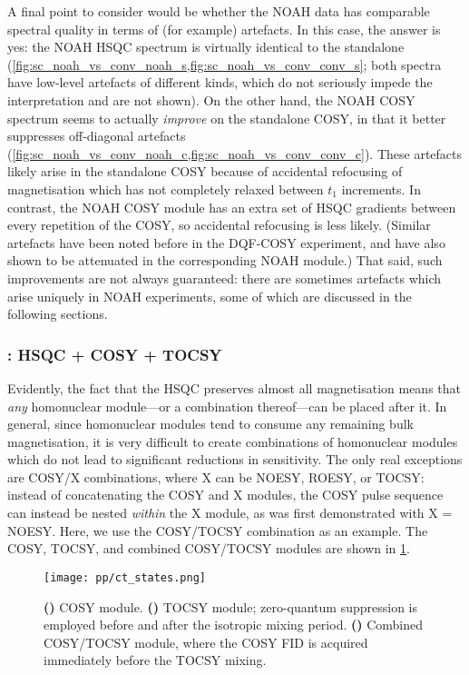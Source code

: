 A final point to consider would be whether the NOAH data has comparable spectral quality in terms of (for example) artefacts.
In this case, the answer is yes: the NOAH HSQC spectrum is virtually identical to the standalone (\cref{fig:sc_noah_vs_conv_noah_s,fig:sc_noah_vs_conv_conv_s}; both spectra have low-level artefacts of different kinds, which do not seriously impede the interpretation and are not shown).
On the other hand, the NOAH COSY spectrum seems to actually \textit{improve} on the standalone COSY, in that it better suppresses off-diagonal artefacts (\cref{fig:sc_noah_vs_conv_noah_c,fig:sc_noah_vs_conv_conv_c}).
These artefacts likely arise in the standalone COSY because of accidental refocusing of magnetisation which has not completely relaxed between $t_1$ increments.\autocite{Vitorge2010JMR}
In contrast, the NOAH COSY module has an extra set of HSQC gradients between every repetition of the COSY, so accidental refocusing is less likely.
(Similar artefacts have been noted before in the DQF-COSY experiment\autocite{Shaw1996JMRSA,Howe2014MRC}, and have also shown to be attenuated in the corresponding NOAH module\autocite{Claridge2019MRC}.)
That said, such improvements are not always guaranteed: there are sometimes artefacts which arise uniquely in NOAH experiments, some of which are discussed in the following sections.


\subsubsection{: HSQC + COSY + TOCSY}

Evidently, the fact that the HSQC preserves almost all  magnetisation means that \textit{any} homonuclear module---or a combination thereof---can be placed after it.
In general, since homonuclear modules tend to consume any remaining bulk magnetisation, it is very difficult to create combinations of homonuclear modules which do not lead to significant reductions in sensitivity.
The only real exceptions are COSY/X combinations, where X can be NOESY, ROESY, or TOCSY: instead of concatenating the COSY and X modules, the COSY pulse sequence can instead be nested \textit{within} the X module, as was first demonstrated with X = NOESY\autocite{Haasnoot1984JMR,Gurevich1984JMR}.
Here, we use the COSY/TOCSY combination as an example.\autocite{Nolis2019MRC}
The COSY, TOCSY, and combined COSY/TOCSY modules are shown in \cref{fig:ct_states}.

\begin{figure}[!ht]
    \centering
    \texttt{[image: pp/ct\_states.png]}%
    {\label{fig:ct_states_c}}%
    {\label{fig:ct_states_t}}%
    {\label{fig:ct_states_ct}}%
    \caption[COSY/TOCSY NOAH module]{
        \textbf{()} COSY module.
        \textbf{()} TOCSY module; zero-quantum suppression is employed before and after the isotropic mixing period.
        \textbf{()} Combined COSY/TOCSY module, where the COSY FID is acquired immediately before the TOCSY mixing.
    }
    \label{fig:ct_states}
\end{figure}

